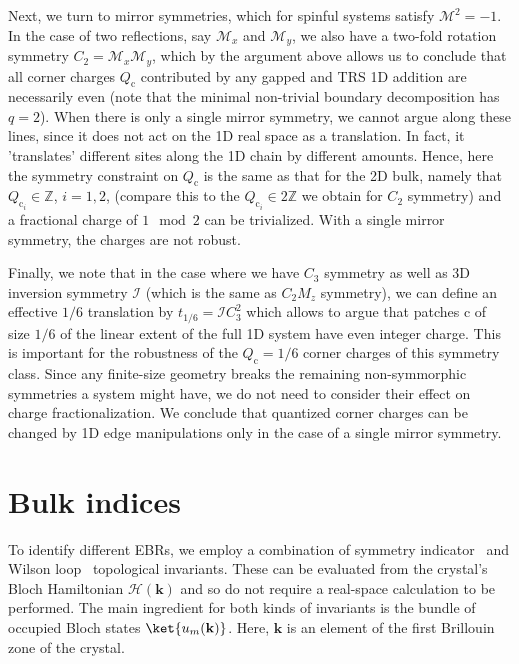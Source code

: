 Next, we turn to mirror symmetries, which for spinful systems satisfy $\mathcal{M}^2 = -1$. In the case of two reflections, say $\mathcal{M}_x$ and $\mathcal{M}_y$, we also have a two-fold rotation symmetry $C_2 = \mathcal{M}_x \mathcal{M}_y$, which by the argument above allows us to conclude that all corner charges $Q_{\mathrm{c}}$ contributed by any gapped and TRS 1D addition are necessarily even (note that the minimal non-trivial boundary decomposition has $q = 2$). When there is only a single mirror symmetry, we cannot argue along these lines, since it does not act on the 1D real space as a translation. In fact, it 'translates' different sites along the 1D chain by different amounts. Hence, here the symmetry constraint on $Q_{\mathrm{c}}$ is the same as that for the 2D bulk, namely that $Q_{\mathrm{c}_i} \in \mathbb{Z}$, $i=1,2$, (compare this to the $Q_{\mathrm{c}_i} \in 2\mathbb{Z}$ we obtain for $C_2$ symmetry) and a fractional charge of $1 \mod 2$ can be trivialized. With a single mirror symmetry, the charges are not robust.

Finally, we note that in the case where we have $C_3$ symmetry as well as 3D inversion symmetry $\mathcal{I}$ (which is the same as $C_2 M_z$ symmetry), we can define an effective $1/6$ translation by $t_{1/6} = \mathcal{I} C_3^2$ which allows to argue that patches $\mathrm{c}$ of size $1/6$ of the linear extent of the full 1D system have even integer charge. This is important for the robustness of the $Q_\mathrm{c} = 1/6$ corner charges of this symmetry class. Since any finite-size geometry breaks the remaining non-symmorphic symmetries a system might have, we do not need to consider their effect on charge fractionalization. We conclude that quantized corner charges can be changed by 1D edge manipulations only in the case of a single mirror symmetry.

\section{Bulk indices}
\label{sec:topologicalindices}
To identify different EBRs, we employ a combination of symmetry indicator~\cite{Hughes:inv,PhysRevB.86.115112, Slager2013,benalcazar2014,Po2017, Bradlyn17,SongZhang17,Khalaf17,benalcazar2018quantization} and Wilson loop~\cite{WilczekZee,berry84,ZakPhase1,ZakPhase2,Slager2013,PhysRevB.89.155114, Slager17,BarryFragile} topological invariants. These can be evaluated from the crystal's Bloch Hamiltonian $\mathcal{H}(\mathbf{k})$ and so do not require a real-space calculation to be performed. The main ingredient for both kinds of invariants is the bundle of occupied Bloch states $\ket{u_{m}(\mathbf{k})}$. Here, $\mathbf{k}$ is an element of the first Brillouin zone of the crystal.

